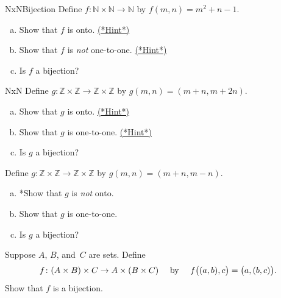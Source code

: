  
 \begin{exercise}{NxNBijection} 
 Define $f \colon \mathbb{N} \times \mathbb{N} \to \mathbb{N}$ by $f(m,n) = m^2 + n - 1$. 
 \begin{enumerate}[(a)]
 \item \label{NxNBijection-m2+n-onto}  
 Show that $f$ is onto.
 \hyperref[sec:functions:hints]{(*Hint*)}
 \item \label{NxNBijection-m2+n-not11}  
 Show that $f$ is \emph{not} one-to-one.
 \hyperref[sec:functions:hints]{(*Hint*)}
\item
Is $f$ a bijection?
 \end{enumerate}
\end{exercise}

\begin{exercise}{NxN}
Define $g \colon \mathbb{Z} \times \mathbb{Z} \to \mathbb{Z} \times \mathbb{Z}$ by $g(m,n) = (m + n, m + 2n)$. 
 \begin{enumerate}[(a)]
 \item  \label{NxNBijection-mpmn-notonto1}  
Show that $g$ is onto.
\hyperref[sec:functions:hints]{(*Hint*)} 
 \item  \label{NxNBijection-mpmn-111}  
Show that $g$ is one-to-one.
\hyperref[sec:functions:hints]{(*Hint*)}
\item
Is $g$ a bijection?
 \end{enumerate}
\end{exercise}

\begin{exercise}{}
Define $g \colon \mathbb{Z} \times \mathbb{Z} \to \mathbb{Z} \times \mathbb{Z}$ by $g(m,n) = (m + n, m - n)$. 
 \begin{enumerate}[(a)]
 \item  \label{NxNBijection-mpmn-notonto}  
*Show that $g$ is \emph{not} onto.
 \item  \label{NxNBijection-mpmn-11}  
Show that $g$ is one-to-one.
\item
Is $g$ a bijection?
 \end{enumerate}
\end{exercise}


\begin{exercise}{} \label{AxBxCBijectionEx}
Suppose $A$, $B$, and~$C$ are sets. Define
	$$ \text{$f \colon (A \times B) \times C \to A \times (B \times C)$ \quad by \quad $f\bigl( (a,b),c \bigr) = \bigl( a,(b, c) \bigr)$.} $$
Show that $f$ is a bijection.
\end{exercise}

